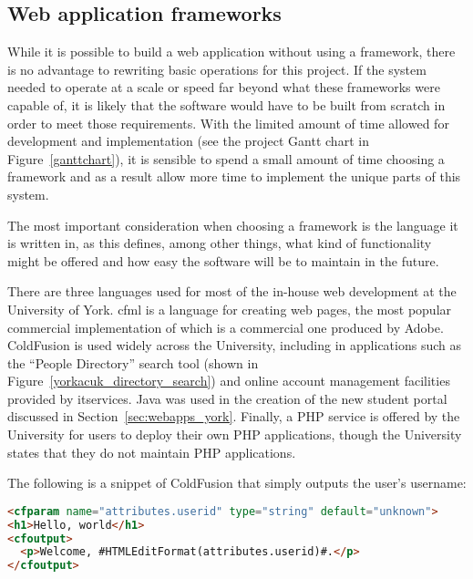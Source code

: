 
\subsection{Web application frameworks}
\label{sec:webframeworks}

While it is possible to build a web application without using a framework,
there is no advantage to rewriting basic operations for this project. If the
system needed to operate at a scale or speed far beyond what these frameworks
were capable of, it is likely that the software would have to be built from
scratch in order to meet those requirements. With the limited amount of time
allowed for development and implementation (see the project Gantt chart in
Figure~\ref{ganttchart}), it is sensible to spend a small amount of time
choosing a framework and as a result allow more time to implement the unique
parts of this system.

The most important consideration when choosing a framework is the language it
is written in, as this defines, among other things, what kind of functionality
might be offered and how easy the software will be to maintain in the future.

There are three languages used for most of the in-house web development at the
University of York. \Gls{cfml} is a language for creating web pages, the most
popular commercial implementation of which is a commercial one produced by
Adobe. ColdFusion is used widely across the University, including in
applications such as the ``People Directory'' search tool (shown in
Figure~\ref{yorkacuk_directory_search}) and online account management
facilities provided by \gls{itservices}. Java was used in the creation of the
new student portal discussed in Section~\ref{sec:webapps_york}. Finally, a PHP
service is offered by the University for users to deploy their own PHP
applications, though the University states that they do not maintain PHP
applications.

\mynobreakpar

The following is a snippet of ColdFusion that simply outputs the user's
username:

\begin{lstlisting}[language=HTML]
<cfparam name="attributes.userid" type="string" default="unknown">
<h1>Hello, world</h1>
<cfoutput>
  <p>Welcome, #HTMLEditFormat(attributes.userid)#.</p>
</cfoutput>
\end{lstlisting}

